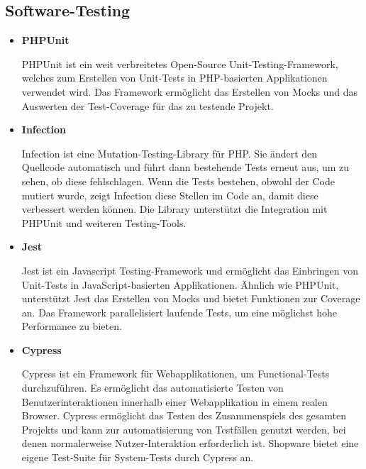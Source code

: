 \subsection*{Software-Testing}

\begin{itemize}
    \item {
        \textbf{PHPUnit}\par
        PHPUnit ist ein weit verbreitetes Open-Source Unit-Testing-Framework, welches zum Erstellen von
        Unit-Tests in PHP-basierten Applikationen verwendet wird.
        Das Framework ermöglicht das Erstellen von Mocks und das Auswerten der Test-Coverage für das zu
        testende Projekt.
    }

    \item {
        \textbf{Infection}\par
        Infection ist eine Mutation-Testing-Library für PHP.
        Sie ändert den Quellcode automatisch und führt dann bestehende Tests erneut aus, um zu sehen, ob diese
        fehlschlagen.
        Wenn die Tests bestehen, obwohl der Code mutiert wurde, zeigt Infection diese Stellen im Code an, damit
        diese verbessert werden können.
        Die Library unterstützt die Integration mit PHPUnit und weiteren Testing-Tools.
    }

    \item {
        \textbf{Jest}\par
        Jest ist ein Javascript Testing-Framework und ermöglicht das Einbringen von Unit-Tests in
        JavaScript-basierten Applikationen.
        Ähnlich wie PHPUnit, unterstützt Jest das Erstellen von Mocks und bietet Funktionen zur Coverage an.
        Das Framework parallelisiert laufende Tests, um eine möglichst hohe Performance zu bieten.
    }

    \item {
        \textbf{Cypress}\par
        Cypress ist ein Framework für Webapplikationen, um Functional-Tests durchzuführen.
        Es ermöglicht das automatisierte Testen von Benutzerinteraktionen innerhalb einer Webapplikation in
        einem realen Browser.
        Cypress ermöglicht das Testen des Zusammenspiels des gesamten Projekts und kann zur automatisierung
        von Testfällen genutzt werden, bei denen normalerweise Nutzer-Interaktion erforderlich ist.
        Shopware bietet eine eigene Test-Suite für System-Tests durch Cypress an.
    }
\end{itemize}


